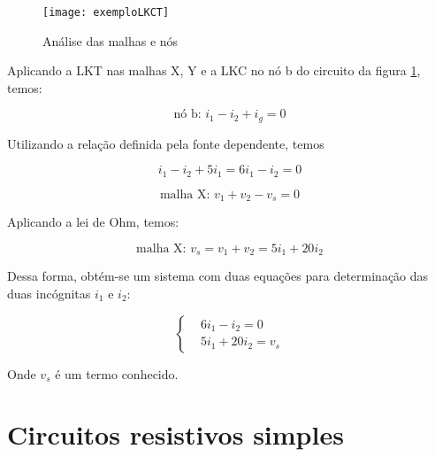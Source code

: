 \documentclass[12pt,fleqn]{book} %
\begin{document}
    \begin{example}
    
        \begin{figure}[!htbp]               
            \centering\texttt{[image: exemploLKCT]}
            \caption{Análise das malhas e nós}\label{LKCTimg} 
        \end{figure}
    
 Aplicando a LKT nas malhas X, Y e a LKC no nó b do circuito da figura \ref{LKCTimg}, temos:    
    
\begin{equation}
\text{nó b: } i_1-i_2+i_g=0
\end{equation}    

    Utilizando a relação definida pela fonte dependente, temos

\begin{equation}
i_1-i_2+5i_1 = 6i_1-i_2=0
\end{equation}    
    
\begin{equation}
\text{malha X: } v_1+v_2-v_s=0
\end{equation}  
    
Aplicando a lei de Ohm, temos:    
    
\begin{equation}
\text{malha X: } v_s=v_1+v_2=5i_1+20i_2
\end{equation}    
    
Dessa forma, obtém-se um sistema com duas equações para determinação das duas incógnitas $i_1$ e $i_2$:    
 
    \begin{equation}\label{sistemaMalhaNo}
    \left\{\begin{aligned} & 
          6i_1-i_2=0\\& 
 5i_1+20i_2=v_s
    \end{aligned}\right.
    \end{equation} 
    
Onde $v_s$ é um termo conhecido.    
    
    \end{example}

	
\chapter{Circuitos resistivos simples}
\end{document}
